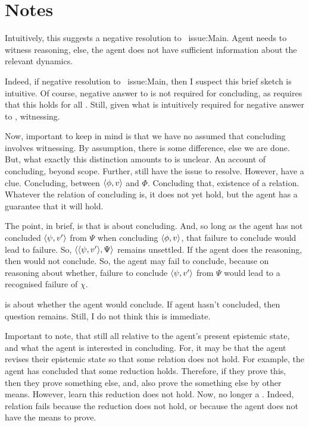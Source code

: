 \section{Notes}

\begin{note}[Witnessing?]
  Intuitively, this suggests a negative resolution to~{\color{red} issue:Main}.
  Agent needs to witness reasoning, else, the agent does not have sufficient information about the relevant dynamics.

  Indeed, if negative resolution to~{\color{red} issue:Main}, then I suspect this brief sketch is intuitive.
  Of course, negative answer to \qzS{} is not required for concluding, as \qzS{} requires that this holds for all .
  Still, given what is intuitively required for negative answer to \qzS{}, witnessing.
\end{note}

\begin{note}
  Now, important to keep in mind is that we have no assumed that concluding involves witnessing.
  By assumption, there is some difference, else we are done.
  But, what exactly this distinction amounts to is unclear.
  An account of concluding, beyond scope.
  Further, still have the issue to resolve.
  However, have a clue.
  Concluding, between \(\langle \phi, v \rangle\) and \(\Phi\).
  Concluding that, existence of a relation.
  Whatever the relation of concluding is, it does not yet hold, but the agent has a guarantee that it will hold.
\end{note}

\begin{note}
  The point, in brief, is that \qzS{} is about concluding.
  And, so long as the agent has not concluded \(\langle \psi, v' \rangle\) from \(\Psi\) when concluding \(\langle \phi, v \rangle\), that failure to conclude would lead to failure.
  So, \(\langle \langle \psi, v' \rangle, \Psi \rangle\) remains unsettled.
  If the agent does the reasoning, then would not conclude.
  So, the agent may fail to conclude, because on reasoning about whether, failure to conclude \(\langle \psi, v' \rangle\) from \(\Psi\) would lead to a recognised failure of \(\chi\).

  \qzS{} is about whether the agent would conclude.
  If agent hasn't concluded, then question remains.
  Still, I do not think this is immediate.
\end{note}


\begin{note}
  Important to note, that still all relative to the agent's present epistemic state, and what the agent is interested in concluding.
  For, it may be that the agent revises their epistemic state so that some relation does not hold.
  For example, the agent has concluded that some reduction holds.
  Therefore, if they prove this, then they prove something else, and, also prove the something else by other means.
  However, learn this reduction does not hold.
  Now, no longer a \requ{}.
  Indeed, relation fails because the reduction does not hold, or because the agent does not have the means to prove.
\end{note}

